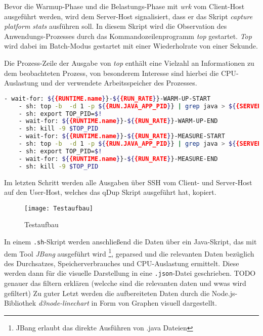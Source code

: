 Bevor die Warmup-Phase und die Belastungs-Phase mit \textit{wrk} vom Client-Host ausgeführt werden, wird dem Server-Host signalisiert, dass
er das Skript \textit{capture platform stats} ausführen soll.
In diesem Skript wird die Observation des Anwendungs-Prozesses durch das Kommandozeilenprogramm \textit{top} gestartet.
\textit{Top} wird dabei im Batch-Modus gestartet mit einer Wiederholrate von einer Sekunde.

Die Prozess-Zeile der Ausgabe von \textit{top} enthält eine Vielzahl an Informationen zu dem beobachteten Prozess, von besonderem
Interesse sind hierbei die CPU-Auslastung und der verwendete Arbeitsspeicher des Prozesses.

\begin{lstlisting}[language=sh, caption=Auszug des qDup Skripts capture-platform-stats, captionpos=b]
    - wait-for: ${{RUNTIME.name}}-${{RUN_RATE}}-WARM-UP-START
    - sh: top -b  -d 1 -p ${{RUN.JAVA_APP_PID}} | grep java > ${{SERVER_FILE_PATH}}/output/${{RUNTIME.name}}-${{RUN_RATE}}-WARM-UP-top.out &
    - sh: export TOP_PID=$!
    - wait-for: ${{RUNTIME.name}}-${{RUN_RATE}}-WARM-UP-END
    - sh: kill -9 $TOP_PID
    - wait-for: ${{RUNTIME.name}}-${{RUN_RATE}}-MEASURE-START
    - sh: top -b  -d 1 -p ${{RUN.JAVA_APP_PID}} | grep java > ${{SERVER_FILE_PATH}}/output/${{RUNTIME.name}}-${{RUN_RATE}}-MEASURE-top.out &
    - sh: export TOP_PID=$!
    - wait-for: ${{RUNTIME.name}}-${{RUN_RATE}}-MEASURE-END
    - sh: kill -9 $TOP_PID
  \end{lstlisting}

Im letzten Schritt werden alle Ausgaben über SSH vom Client- und Server-Host auf den User-Host, welches das qDup Skript ausgeführt hat, kopiert.

\begin{figure}[h!]
    \centering
    \texttt{[image: Testaufbau]}
    \caption{Testaufbau}
\end{figure}

In einem \verb|.sh|-Skript werden anschließend die Daten über ein Java-Skript, das mit dem Tool \textit{JBang} ausgeführt
wird \footnote{JBang erlaubt das direkte Ausführen von .java Dateien},
geparsed und die relevanten Daten bezüglich des Durchsatzes, Speicherverbrauches und CPU-Auslastung ermittelt.
Diese werden dann für die visuelle Darstellung in eine \verb|.json|-Datei geschrieben.
TODO genauer das filtern erklären (welcche sind die relevanten daten und wwas wird gefiltert)
Zu guter Letzt werden die aufbereiteten Daten durch die Node.js-Bibliothek \textit{d3node-linechart} in Form von Graphen visuell dargestellt.

